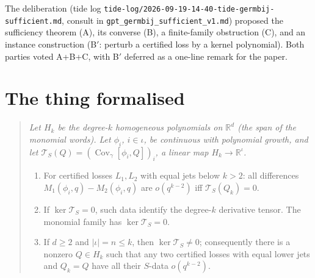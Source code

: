 \documentclass[11pt]{article}
\newcommand{\R}{\mathbb{R}}
\newcommand{\code}[1]{\texttt{#1}}
\newcommand{\Cov}{\operatorname{Cov}}
\begin{document}
The deliberation (tide log
\code{tide-log/2026-09-19-14-40-tide-germbij-sufficient.md}, consult in
\code{gpt\_germbij\_sufficient\_v1.md}) proposed the sufficiency theorem
(A), its converse (B), a finite-family obstruction (C), and an instance
construction (B$'$: perturb a certified loss by a kernel polynomial).
Both parties voted A+B+C, with B$'$ deferred as a one-line remark for
the paper.

\section{The thing formalised}

\begin{quote}\itshape
Let $H_k$ be the degree-$k$ homogeneous polynomials on $\R^d$ (the span
of the monomial words). Let $\phi_i$, $i \in \iota$, be continuous with
polynomial growth, and let $\mathcal T_S(Q) = (\Cov_\gamma[\phi_i,
Q])_i$, a linear map $H_k \to \R^\iota$.
\begin{enumerate}
\item[(B)] For certified losses $L_1, L_2$ with equal jets below $k >
2$: all differences $M_1(\phi_i, q) - M_2(\phi_i, q)$ are $o(q^{k-2})$
iff $\mathcal T_S(Q_k) = 0$.
\item[(A)] If $\ker \mathcal T_S = 0$, such data identify the degree-$k$
derivative tensor. The monomial family has $\ker \mathcal T_S = 0$.
\item[(C)] If $d \ge 2$ and $|\iota| = n \le k$, then $\ker
\mathcal T_S \neq 0$; consequently there is a nonzero $Q \in H_k$ such
that any two certified losses with equal lower jets and $Q_k = Q$ have
all their $S$-data $o(q^{k-2})$.
\end{enumerate}
\end{quote}
\end{document}
